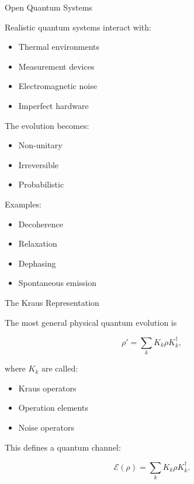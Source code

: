\documentclass{beamer}
\begin{document}
\begin{frame}{Open Quantum Systems}

Realistic quantum systems interact with:

\begin{itemize}
    \item Thermal environments
    \item Measurement devices
    \item Electromagnetic noise
    \item Imperfect hardware
\end{itemize}

\vspace{0.3cm}

The evolution becomes:

\begin{itemize}
    \item Non-unitary
    \item Irreversible
    \item Probabilistic
\end{itemize}

\vspace{0.4cm}

Examples:
\begin{itemize}
    \item Decoherence
    \item Relaxation
    \item Dephasing
    \item Spontaneous emission
\end{itemize}

\end{frame}

\begin{frame}{The Kraus Representation}

The most general physical quantum evolution is

\[
\rho'
=
\sum_k
K_k \rho K_k^\dagger,
\]

where \(K_k\) are called:

\begin{itemize}
    \item Kraus operators
    \item Operation elements
    \item Noise operators
\end{itemize}

\vspace{0.4cm}

This defines a quantum channel:

\[
\mathcal{E}(\rho)
=
\sum_k K_k \rho K_k^\dagger.
\]

\end{frame}
\end{document}
